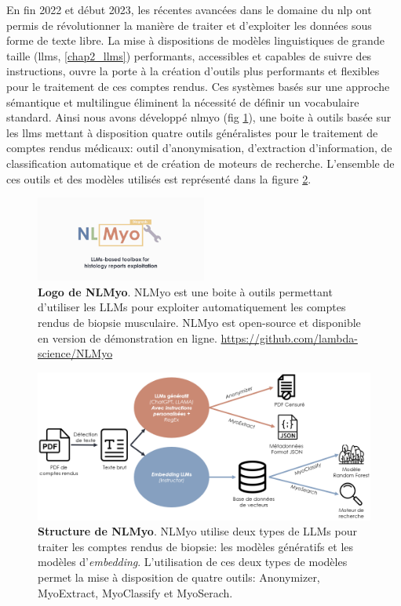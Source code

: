 En fin 2022 et début 2023, les récentes avancées dans le domaine du \gls{nlp} ont permis de révolutionner la manière de traiter et d'exploiter les données sous forme de texte libre. La mise à dispositions de modèles linguistiques de grande taille (\gls{llms}, \ref{chap2_llms}) performants, accessibles et capables de suivre des instructions, ouvre la porte à la création d'outils plus performants et flexibles pour le traitement de ces comptes rendus. Ces systèmes basés sur une approche sémantique et multilingue éliminent la nécessité de définir un vocabulaire standard. Ainsi nous avons développé \gls{nlmyo} (fig \ref{fig:nlmyo_logo}), une boite à outils basée sur les \gls{llms} mettant à disposition quatre outils généralistes pour le traitement de comptes rendus médicaux: outil d'anonymisation, d'extraction d'information, de classification automatique et de création de moteurs de recherche. L'ensemble de ces outils et des modèles utilisés est représenté dans la figure \ref{fig:nlmyo_struct}.
\begin{figure}[!htbp]
 \centering
 \includegraphics[width=0.5\textwidth]{figures/nlmyo_banner.png}
 \caption[Logo NLMyo]{\textbf{Logo de NLMyo}. NLMyo est une boite à outils permettant d'utiliser les LLMs pour exploiter automatiquement les comptes rendus de biopsie musculaire. NLMyo est open-source et disponible en version de démonstration en ligne. \url{https://github.com/lambda-science/NLMyo}}
 \label{fig:nlmyo_logo}
\end{figure}
\begin{figure}[!htbp]
 \centering
 \includegraphics[width=1\textwidth]{figures/nlmyo_struct.png}
 \caption[Structure de NLMyo]{\textbf{Structure de NLMyo}. NLMyo utilise deux types de LLMs pour traiter les comptes rendus de biopsie: les modèles génératifs et les modèles d'\textit{embedding}. L'utilisation de ces deux types de modèles permet la mise à disposition de quatre outils: Anonymizer, MyoExtract, MyoClassify et MyoSerach.}
 \label{fig:nlmyo_struct}
\end{figure}
